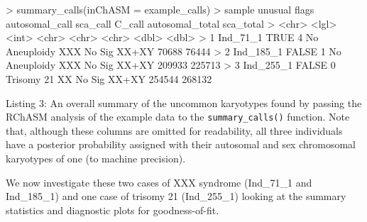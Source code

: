\documentclass[
  letterpaper,
  DIV=11,
  numbers=noendperiod]{scrartcl}
\newenvironment{Shaded}{\begin{snugshade}}{\end{snugshade}}
\newcommand{\AttributeTok}[1]{\textcolor[rgb]{0.40,0.45,0.13}{#1}}
\newcommand{\ConstantTok}[1]{\textcolor[rgb]{0.56,0.35,0.01}{#1}}
\newcommand{\DecValTok}[1]{\textcolor[rgb]{0.68,0.00,0.00}{#1}}
\newcommand{\ErrorTok}[1]{\textcolor[rgb]{0.68,0.00,0.00}{#1}}
\newcommand{\FunctionTok}[1]{\textcolor[rgb]{0.28,0.35,0.67}{#1}}
\newcommand{\NormalTok}[1]{\textcolor[rgb]{0.00,0.23,0.31}{#1}}
\newcommand{\SpecialCharTok}[1]{\textcolor[rgb]{0.37,0.37,0.37}{#1}}
\begin{document}
\footnotesize

\begin{Shaded}
\begin{Highlighting}[]
\SpecialCharTok{\textgreater{}} \FunctionTok{summary\_calls}\NormalTok{(}\AttributeTok{inChASM =}\NormalTok{ example\_calls)}
\SpecialCharTok{\textgreater{}}\NormalTok{   sample    unusual flags autosomal\_call sca\_call C\_call       autosomal\_total sca\_total}
\SpecialCharTok{\textgreater{}}   \ErrorTok{\textless{}}\NormalTok{chr}\SpecialCharTok{\textgreater{}}     \ErrorTok{\textless{}}\NormalTok{lgl}\SpecialCharTok{\textgreater{}}   \ErrorTok{\textless{}}\NormalTok{int}\SpecialCharTok{\textgreater{}} \ErrorTok{\textless{}}\NormalTok{chr}\SpecialCharTok{\textgreater{}}          \ErrorTok{\textless{}}\NormalTok{chr}\SpecialCharTok{\textgreater{}}    \ErrorTok{\textless{}}\NormalTok{chr}\SpecialCharTok{\textgreater{}}        \ErrorTok{\textless{}}\NormalTok{dbl}\SpecialCharTok{\textgreater{}}           \ErrorTok{\textless{}}\NormalTok{dbl}\SpecialCharTok{\textgreater{}}
\ErrorTok{\textgreater{}} \DecValTok{1}\NormalTok{ Ind\_71\_1  }\ConstantTok{TRUE}    \DecValTok{4}\NormalTok{     No Aneuploidy  XXX      No Sig XX}\SpecialCharTok{+}\NormalTok{XY }\DecValTok{70688}           \DecValTok{76444}
\SpecialCharTok{\textgreater{}} \DecValTok{2}\NormalTok{ Ind\_185\_1 }\ConstantTok{FALSE}   \DecValTok{1}\NormalTok{     No Aneuploidy  XXX      No Sig XX}\SpecialCharTok{+}\NormalTok{XY }\DecValTok{209933}          \DecValTok{225713}
\SpecialCharTok{\textgreater{}} \DecValTok{3}\NormalTok{ Ind\_255\_1 }\ConstantTok{FALSE}   \DecValTok{0}\NormalTok{     Trisomy }\DecValTok{21}\NormalTok{     XX       No Sig XX}\SpecialCharTok{+}\NormalTok{XY }\DecValTok{254544}          \DecValTok{268132}
\end{Highlighting}
\end{Shaded}

\normalsize

Listing 3: An overall summary of the uncommon karyotypes found by
passing the RChASM analysis of the example data to the
\texttt{summary\_calls()} function. Note that, although these columns
are omitted for readability, all three individuals have a posterior
probability assigned with their autosomal and sex chromosomal karyotypes
of one (to machine precision)\label{fig:summary_callsOutput}.

We now investigate these two cases of XXX syndrome (Ind\_71\_1 and
Ind\_185\_1) and one case of trisomy 21 (Ind\_255\_1) looking at the
summary statistics and diagnostic plots for goodness-of-fit.
\end{document}
